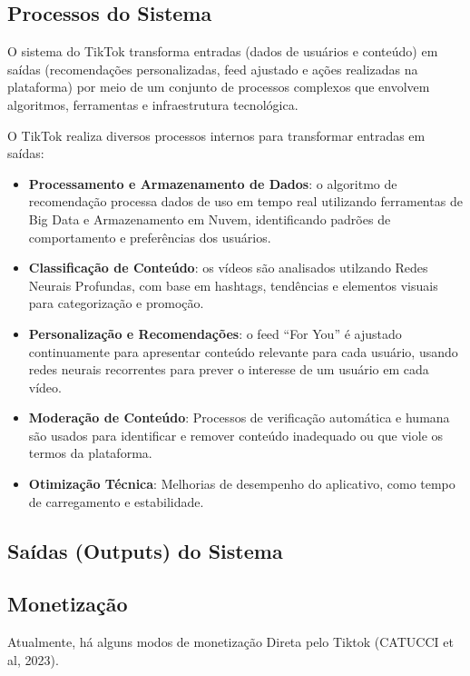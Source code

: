\newpage
\subsection{Processos do Sistema}

O sistema do TikTok transforma entradas (dados de usuários e conteúdo) em saídas (recomendações personalizadas, feed ajustado e ações realizadas na plataforma) por meio de um conjunto de processos complexos que envolvem algoritmos, ferramentas e infraestrutura tecnológica. \vskip0.3cm

O TikTok realiza diversos processos internos para transformar entradas em saídas:

\begin{itemize}
    \item \textbf{Processamento e Armazenamento de Dados}: o algoritmo de recomendação processa dados de uso em tempo real utilizando ferramentas de Big Data e Armazenamento em Nuvem, identificando padrões de comportamento e preferências dos usuários.
    \item \textbf{Classificação de Conteúdo}: os vídeos são analisados utilzando Redes Neurais Profundas, com base em hashtags, tendências e elementos visuais para categorização e promoção.
    \item \textbf{Personalização e Recomendações}: o feed “For You” é ajustado continuamente para apresentar conteúdo relevante para cada usuário, usando redes neurais recorrentes para prever o interesse de um usuário em cada vídeo.
    \item \textbf{Moderação de Conteúdo}: Processos de verificação automática e humana são usados para identificar e remover conteúdo inadequado ou que viole os termos da plataforma.
    \item \textbf{Otimização Técnica}: Melhorias de desempenho do aplicativo, como tempo de carregamento e estabilidade.
\end{itemize}


\newpage
\subsection{Saídas (Outputs) do Sistema}

\subsection{Monetização}

Atualmente, há alguns modos de monetização Direta pelo Tiktok (CATUCCI et al, 2023).

